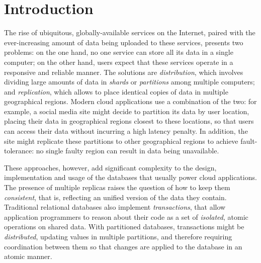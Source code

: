 \cleardoublepage
\chapter{Introduction}
\label{chapter:introduction}


The rise of ubiquitous, globally-available services on the Internet, paired with the ever-increasing amount of data being uploaded to these services, presents two problems: on the one hand, no one service can store all its data in a single computer; on the other hand, users expect that these services operate in a responsive and reliable manner. The solutions are \emph{distribution}, which involves dividing large amounts of data in \emph{shards} or \emph{partitions} among multiple computers; and \emph{replication}, which allows to place identical copies of data in multiple geographical regions. Modern cloud applications use a combination of the two: for example, a social media site might decide to partition its data by user location, placing their data in geographical regions closest to these locations, so that users can access their data without incurring a high latency penalty. In addition, the site might replicate these partitions to other geographical regions to achieve fault-tolerance: no single faulty region can result in data being unavailable.

These approaches, however, add significant complexity to the design, implementation and usage of the databases that usually power cloud applications. The presence of multiple replicas raises the question of how to keep them \emph{consistent}, that is, reflecting an unified version of the data they contain. Traditional relational databases also implement \emph{transactions}, that allow application programmers to reason about their code as a set of \emph{isolated}, atomic operations on shared data. With partitioned databases, transactions might be \emph{distributed}, updating values in multiple partitions, and therefore requiring coordination between them so that changes are applied to the database in an atomic manner.

